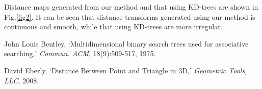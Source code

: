 \documentclass[11pt]{article}
\begin{document}
Distance maps generated from our method and that using KD-trees are shown in Fig.\ref{fig2}. It can be seen that distance transforms generated using our method is continuous and smooth, while that using KD-trees are more irregular.

\begin{thebibliography}{9}

\small
\addtolength{\itemsep}{-9pt}

John Louis Bentley, `Multidimensional binary search trees used for associative searching,' 
\emph{Commun. ACM}, 18(9):509-517, 1975.

David Eberly, `Distance Between Point and Triangle in 3D,'
\emph{Geometric Tools, LLC}, 2008.


\end{thebibliography}
\end{document}
